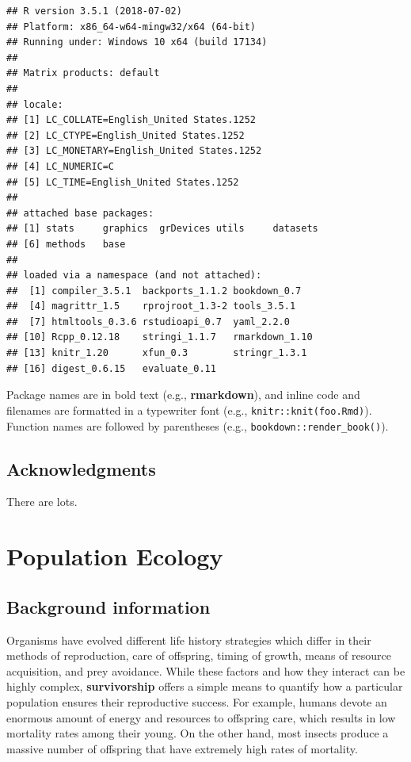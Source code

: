 \documentclass[]{book}
\theoremstyle{definition}
\theoremstyle{definition}
\theoremstyle{definition}
\theoremstyle{remark}
\begin{document}
\begin{verbatim}
## R version 3.5.1 (2018-07-02)
## Platform: x86_64-w64-mingw32/x64 (64-bit)
## Running under: Windows 10 x64 (build 17134)
## 
## Matrix products: default
## 
## locale:
## [1] LC_COLLATE=English_United States.1252 
## [2] LC_CTYPE=English_United States.1252   
## [3] LC_MONETARY=English_United States.1252
## [4] LC_NUMERIC=C                          
## [5] LC_TIME=English_United States.1252    
## 
## attached base packages:
## [1] stats     graphics  grDevices utils     datasets 
## [6] methods   base     
## 
## loaded via a namespace (and not attached):
##  [1] compiler_3.5.1  backports_1.1.2 bookdown_0.7   
##  [4] magrittr_1.5    rprojroot_1.3-2 tools_3.5.1    
##  [7] htmltools_0.3.6 rstudioapi_0.7  yaml_2.2.0     
## [10] Rcpp_0.12.18    stringi_1.1.7   rmarkdown_1.10 
## [13] knitr_1.20      xfun_0.3        stringr_1.3.1  
## [16] digest_0.6.15   evaluate_0.11
\end{verbatim}

Package names are in bold text (e.g., \textbf{rmarkdown}), and inline
code and filenames are formatted in a typewriter font (e.g.,
\texttt{knitr::knit(\textquotesingle{}foo.Rmd\textquotesingle{})}).
Function names are followed by parentheses (e.g.,
\texttt{bookdown::render\_book()}).

\section*{Acknowledgments}\label{acknowledgments}


There are lots.

\mainmatter

\chapter{Population Ecology}\label{population}

\section{Background information}\label{background-information}

Organisms have evolved different life history strategies which differ in
their methods of reproduction, care of offspring, timing of growth,
means of resource acquisition, and prey avoidance. While these factors
and how they interact can be highly complex, \textbf{survivorship}
offers a simple means to quantify how a particular population ensures
their reproductive success. For example, humans devote an enormous
amount of energy and resources to offspring care, which results in low
mortality rates among their young. On the other hand, most insects
produce a massive number of offspring that have extremely high rates of
mortality.
\end{document}
